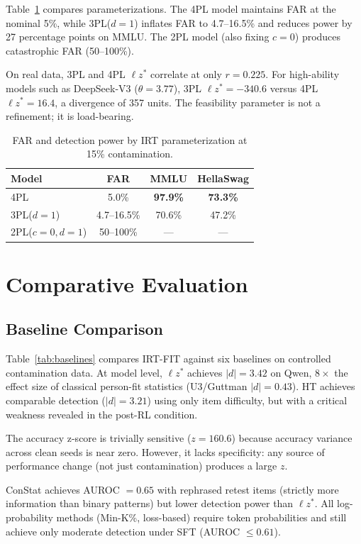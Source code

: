 \documentclass[11pt,a4paper]{article}
\newcommand{\lzstar}{$\ell z^*$}
\begin{document}
Table~\ref{tab:ablation} compares parameterizations. The 4PL model maintains FAR at the nominal 5\%, while 3PL($d{=}1$) inflates FAR to 4.7--16.5\% and reduces power by 27 percentage points on MMLU. The 2PL model (also fixing $c{=}0$) produces catastrophic FAR (50--100\%).

On real data, 3PL and 4PL $\ell z^*$ correlate at only $r=0.225$. For high-ability models such as DeepSeek-V3 ($\theta=3.77$), 3PL $\ell z^* = -340.6$ versus 4PL $\ell z^* = 16.4$, a divergence of 357 units. The feasibility parameter is not a refinement; it is load-bearing.

\begin{table}[t]
\centering
\caption{FAR and detection power by IRT parameterization at 15\% contamination.}
\label{tab:ablation}
\small
\begin{tabular}{lccc}
\toprule
Model & FAR & MMLU & HellaSwag \\
\midrule
4PL & 5.0\% & \textbf{97.9\%} & \textbf{73.3\%} \\
3PL($d{=}1$) & 4.7--16.5\% & 70.6\% & 47.2\% \\
2PL($c{=}0,d{=}1$) & 50--100\% & --- & --- \\
\bottomrule
\end{tabular}
\end{table}

\section{Comparative Evaluation}\label{sec:baselines}

\subsection{Baseline Comparison}

Table~\ref{tab:baselines} compares IRT-FIT against six baselines on controlled contamination data. At model level, \lzstar{} achieves $|d|=3.42$ on Qwen, $8\times$ the effect size of classical person-fit statistics (U3/Guttman $|d|=0.43$). HT achieves comparable detection ($|d|=3.21$) using only item difficulty, but with a critical weakness revealed in the post-RL condition.

The accuracy z-score is trivially sensitive ($z=160.6$) because accuracy variance across clean seeds is near zero. However, it lacks specificity: any source of performance change (not just contamination) produces a large $z$.

ConStat achieves AUROC $=0.65$ with rephrased retest items (strictly more information than binary patterns) but lower detection power than \lzstar{}. All log-probability methods (Min-K\%, loss-based) require token probabilities and still achieve only moderate detection under SFT (AUROC $\leq 0.61$).
\end{document}
